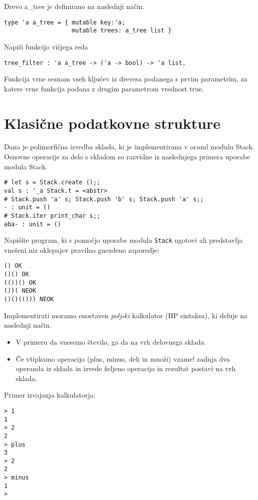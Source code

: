 \begin{ex}
Drevo a\_tree je definirano na naslednji na\v cin.
\begin{lstlisting}
type 'a a_tree = { mutable key:'a; 
                   mutable trees: a_tree list }
\end{lstlisting}

Napi\v si funkcijo vi\v sjega reda
\begin{lstlisting}
tree_filter : 'a a_tree -> ('a -> bool) -> 'a list.
\end{lstlisting}
Funkcija vrne seznam vseh klju\v cev iz drevesa podanega s prvim parametrim, za katere vrne funkcija podana z drugim parametrom vrednost true.
\end{ex} 






\section{Klasi\v cne podatkovne strukture}




\begin{ex}
Dana je polimorfi\v cna izvedba sklada, ki je implementirana v ocaml modulu Stack. Osnovne operacije za delo s skladom so razvidne iz naslednjega primera uporabe modula Stack.

\begin{lstlisting}
# let s = Stack.create ();;
val s : '_a Stack.t = <abstr>
# Stack.push 'a' s; Stack.push 'b' s; Stack.push 'a' s;;
- : unit = ()
# Stack.iter print_char s;;
aba- : unit = ()
\end{lstlisting}

Napi\v site program, ki s pomo\v cjo uporabe modula \lstinline{Stack} ugotovi ali predstavlja vne\v seni niz oklepajev pravilno gnezdeno zaporedje:

\begin{lstlisting}
() OK
()() OK
(())() OK
())( NEOK
()()(())) NEOK
\end{lstlisting}
\end{ex}



\begin{ex}
Implementirati moramo enostaven \emph{poljski} kalkulator (HP sintaksa), ki deluje na naslednji na\v cin.
\begin{itemize}
\item V primeru da vnesemo \v stevilo, ga da na vrh delovnega sklada.
\item \v Ce vtipkamo operacijo (plus, minus, deli in mno\v zi) vzame! zadnja dva operanda iz sklada in izvede \v zeljeno operacijo in rezultat postavi na vrh sklada.
\end{itemize}

Primer izvajanja kalkulatorja:
\begin{lstlisting}
> 1
1
> 2
2
> plus
3
> 2
2
> minus
1
>
\end{lstlisting}
\end{ex}



